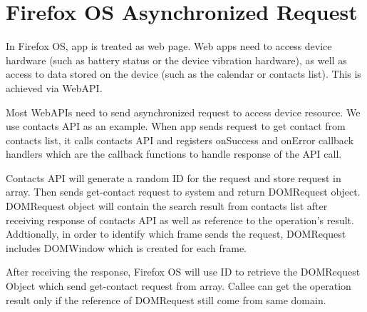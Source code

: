 \documentclass[12pt]{article}
\begin{document}
\section*{Firefox OS Asynchronized Request}
In Firefox OS, app is treated as web page. Web apps need to access device hardware (such as battery status or the device vibration hardware), as well as access to data stored on the device (such as the calendar or contacts list). This is achieved via WebAPI. %

Most WebAPIs need to send asynchronized request to access device resource. We use contacts API as an example. When app sends request to get contact from contacts list,  it calls contacts API and registers onSuccess and onError callback handlers which are the callback functions to handle response of the API call. %

Contacts API will generate a random ID for the request and store request in array. Then sends get-contact request to system and return DOMRequest object. DOMRequest object will contain the search result from contacts list after receiving response of contacts API as well as reference to the operation's result. Addtionally, in order to identify which frame sends the request, DOMRequest includes DOMWindow which is created for each frame. %

After receiving the response, Firefox OS will use ID to retrieve the DOMRequest Object which send get-contact request from array. Callee can get the operation result only if the reference of DOMRequest still come from same domain.  %
\end{document}
